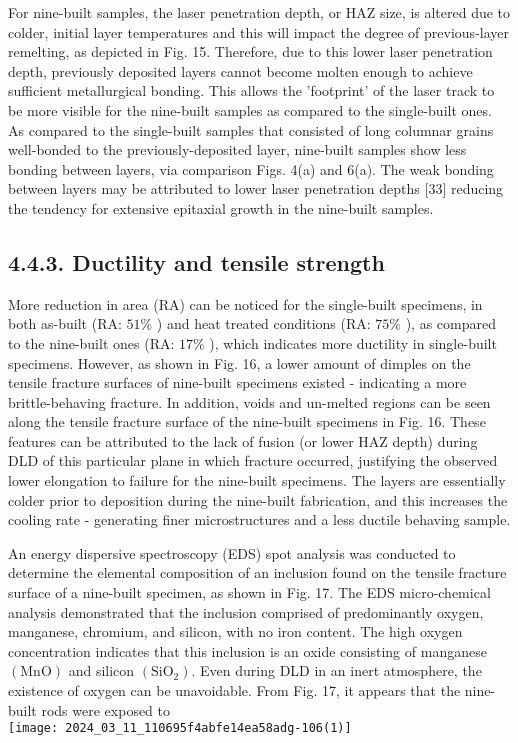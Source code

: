 \documentclass[10pt]{article}
\begin{document}
For nine-built samples, the laser penetration depth, or HAZ size, is altered due to colder, initial layer temperatures and this will impact the degree of previous-layer remelting, as depicted in Fig. 15. Therefore, due to this lower laser penetration depth, previously deposited layers cannot become molten enough to achieve sufficient metallurgical bonding. This allows the 'footprint' of the laser track to be more visible for the nine-built samples as compared to the single-built ones. As compared to the single-built samples that consisted of long columnar grains well-bonded to the previously-deposited layer, nine-built samples show less bonding between layers, via comparison Figs. 4(a) and 6(a). The weak bonding between layers may be attributed to lower laser penetration depths [33] reducing the tendency for extensive epitaxial growth in the nine-built samples.

\subsection*{4.4.3. Ductility and tensile strength}
More reduction in area (RA) can be noticed for the single-built specimens, in both as-built (RA: $51 \%$ ) and heat treated conditions (RA: $75 \%$ ), as compared to the nine-built ones (RA: $17 \%$ ), which indicates more ductility in single-built specimens. However, as shown in Fig. 16, a lower amount of dimples on the tensile fracture surfaces of nine-built specimens existed - indicating a more brittle-behaving fracture. In addition, voids and un-melted regions can be seen along the tensile fracture surface of the nine-built specimens in Fig. 16. These features can be attributed to the lack of fusion (or lower HAZ depth) during DLD of this particular plane in which fracture occurred, justifying the observed lower elongation to failure for the nine-built specimens. The layers are essentially colder prior to deposition during the nine-built fabrication, and this increases the cooling rate - generating finer microstructures and a less ductile behaving sample.

An energy dispersive spectroscopy (EDS) spot analysis was conducted to determine the elemental composition of an inclusion found on the tensile fracture surface of a nine-built specimen, as shown in Fig. 17. The EDS micro-chemical analysis demonstrated that the inclusion comprised of predominantly oxygen, manganese, chromium, and silicon, with no iron content. The high oxygen concentration indicates that this inclusion is an oxide consisting of manganese $(\mathrm{MnO})$ and silicon $\left(\mathrm{SiO}_{2}\right)$. Even during DLD in an inert atmosphere, the existence of oxygen can be unavoidable. From Fig. 17, it appears that the nine-built rods were exposed to\\
\texttt{[image: 2024\_03\_11\_110695f4abfe14ea58adg-106(1)]}
\end{document}

